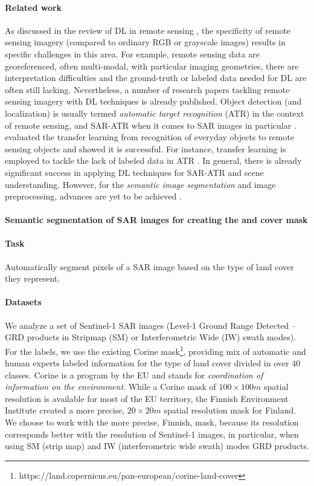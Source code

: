 \documentclass[a4paper]{article}
\begin{document}
\paragraph{Related work} As discussed in the review of DL in remote sensing \cite{zhu2017deep}, the specificity of remote sensing imagery (compared to ordinary RGB or grayscale images) results in specific challenges in this area. For example, remote sensing data are georeferenced, often multi-modal, with particular imaging geometries, there are interpretation difficulties and the ground-truth or labeled data needed for DL are often still lacking. Nevertheless, a number of research papers tackling remote sensing imagery with DL techniques is already published. Object detection (and localization) is usually termed \textit{automatic target recognition} (ATR) in the context of remote sensing, and SAR-ATR when it comes to SAR images in particular \cite{7460942}.
\citeauthor{7301382} \cite{7301382} evaluated the transfer learning from recognition of everyday objects to remote sensing objects and showed it is successful. For instance, transfer learning is employed to tackle the lack of labeled data in ATR \cite{huang2017transfer}. In general, there is already significant success in applying DL techniques for SAR-ATR and scene understanding. However, for the \textit{semantic image segmentation} and image preprocessing, advances are yet to be achieved \cite{zhang2016deep}.

\paragraph{Semantic segmentation of SAR images for creating the and cover mask}

\paragraph{Task} Automatically segment pixels of a SAR image based on the type of land cover they represent.

\paragraph{Datasets}
We analyze a set of Sentinel-1 SAR images (Level-1 Ground Range Detected -- GRD products in Stripmap (SM) or Interferometric Wide (IW) swath modes). For the labels, we use the existing Corine mask\footnote{https://land.copernicus.eu/pan-european/corine-land-cover}, providing mix of automatic and human experts labeled information for the type of land cover divided in over $40$ classes. Corine is a program by the EU and stands for \textit{coordination of information on the environment}. While a Corine mask of $100\times 100m$ spatial resolution is available for most of the EU territory, the Finnish Environment Institute created a more precise, $20\times 20m$ spatial resolution mask for Finland. We choose to work with the more precise, Finnish, mask, because its resolution corresponds better with the resolution of Sentinel-1 images, in particular, when using SM (strip map) and IW (interferometric wide swath) modes GRD products.
\end{document}
